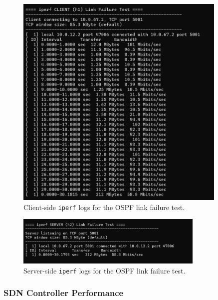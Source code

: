 \documentclass[12pt]{article}
\begin{document}
\begin{figure}[h!]
    \centering
    \includegraphics[width=0.9\textwidth]{p4_link_failure_client_ospf.jpeg}
    \caption{Client-side \texttt{iperf} logs for the OSPF link failure test.}
    \label{fig:ospf_link_failure_logs}
\end{figure}

\begin{figure}[h!]
    \centering
    \includegraphics[width=0.8\textwidth]{p4_link_failure_server_ospf.jpeg}
    \caption{Server-side \texttt{iperf} logs for the OSPF link failure test.}
    \label{fig:ospf_link_failure_client_logs}
\end{figure}

\subsubsection{SDN Controller Performance}
\end{document}
